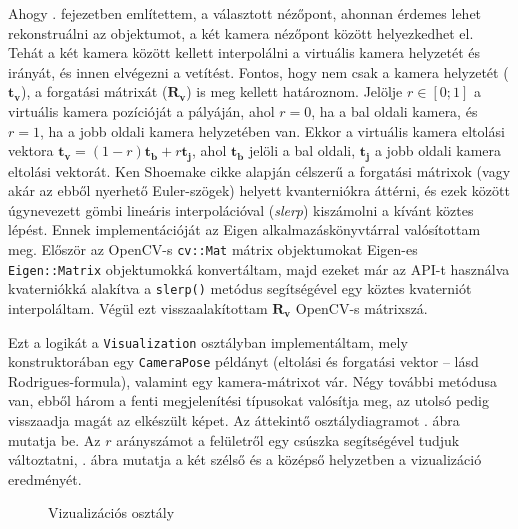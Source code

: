 Ahogy . fejezetben említettem, a választott nézőpont, ahonnan érdemes lehet rekonstruálni az objektumot, a két kamera nézőpont között helyezkedhet el. Tehát a két kamera között kellett interpolálni a virtuális kamera helyzetét és irányát, és innen elvégezni a vetítést. Fontos, hogy nem csak a kamera helyzetét ($\mathbf{t_v}$), a forgatási mátrixát ($\mathbf{R_v}$) is meg kellett határoznom. Jelölje $r \in [0; 1]$ a virtuális kamera pozícióját a pályáján, ahol $r = 0$, ha a bal oldali kamera, és $r = 1$, ha a jobb oldali kamera helyzetében van. Ekkor a virtuális kamera eltolási vektora $\mathbf{t_v} = (1-r)\mathbf{t_b} + r\mathbf{t_j}$, ahol $\mathbf{t_b}$ jelöli a bal oldali, $\mathbf{t_j}$ a jobb oldali kamera eltolási vektorát. Ken Shoemake cikke \cite{quaternion} alapján célszerű a forgatási mátrixok (vagy akár az ebből nyerhető Euler-szögek) helyett kvanterniókra áttérni, és ezek között úgynevezett gömbi lineáris interpolációval (\textit{slerp}) kiszámolni a kívánt köztes lépést. Ennek implementációját az Eigen \cite{eigenweb} alkalmazáskönyvtárral valósítottam meg. Először az OpenCV-s \texttt{cv::Mat} mátrix objektumokat Eigen-es \texttt{Eigen::Matrix} objektumokká konvertáltam, majd ezeket már az API-t használva kvaterniókká alakítva a \texttt{slerp()} metódus segítségével egy köztes kvaterniót interpoláltam. Végül ezt visszaalakítottam $\mathbf{R_v}$ OpenCV-s mátrixszá.

Ezt a logikát a \texttt{Visualization} osztályban implementáltam, mely konstruktorában egy \texttt{CameraPose} példányt (eltolási és forgatási vektor -- lásd Rodrigues-formula), valamint egy kamera-mátrixot vár. Négy további metódusa van, ebből három a fenti megjelenítési típusokat valósítja meg, az utolsó pedig visszaadja magát az elkészült képet. Az áttekintő osztálydiagramot . ábra mutatja be. Az $r$ arányszámot a felületről egy csúszka segítségével tudjuk változtatni, . ábra mutatja a két szélső és a középső helyzetben a vizualizáció eredményét.

\begin{figure}[tbh]
\centering


\caption{Vizualizációs osztály \label{fig:cd:visualization}}
\end{figure}


